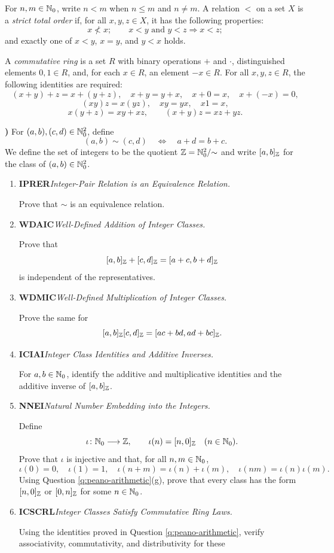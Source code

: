 \documentclass[10pt,a4paper]{article}
\newcounter{examquestion}
\newcommand{\examquestion}[1]{%
  \Needspace{5\baselineskip}%
  \refstepcounter{examquestion}%
  \par\addvspace{0.8\baselineskip}%
  \noindent\textbf{\theexamquestion)}\enspace #1\par
}
\newenvironment{subquestions}
  {\begin{enumerate}[label=\alph*),leftmargin=2.1em]}
  {\end{enumerate}}
\newcommand{\nameditem}[2]{%
  \textbf{\textsf{#1}}\enspace\emph{#2.}\enspace
}
\begin{document}
For $n,m\in\mathbb{N}_0$, write $n<m$ when $n\leq m$ and $n\ne m$.
A relation $<$ on a set $X$ is a \emph{strict total order} if, for all
$x,y,z\in X$, it has the following properties:
\[
  x\nless x;\qquad
  x<y\text{ and }y<z\Longrightarrow x<z;
\]
and exactly one of $x<y$, $x=y$, and $y<x$ holds.

A \emph{commutative ring} is a set $R$ with binary operations $+$ and
$\cdot$, distinguished elements $0,1\in R$, and, for each $x\in R$, an
element $-x\in R$.  For all $x,y,z\in R$, the following identities are
required:
\[
  (x+y)+z=x+(y+z),\quad x+y=y+x,\quad x+0=x,\quad x+(-x)=0,
\]
\[
  (xy)z=x(yz),\quad xy=yx,\quad x1=x,
\]
\[
  x(y+z)=xy+xz,\qquad (x+y)z=xz+yz.
\]

\examquestion{\label{q:integers}
For $(a,b),(c,d)\in\mathbb{N}_0^2$, define
\[
  (a,b)\sim(c,d)\quad\Longleftrightarrow\quad a+d=b+c.
\]
We define the set of integers to be the quotient
$\mathbb{Z}=\mathbb{N}_0^2/{\sim}$ and write $[a,b]_{\mathbb{Z}}$ for the class of
$(a,b)\in\mathbb{N}_0^2$.
\begin{subquestions}
  \item \nameditem{IPRER}{Integer-Pair Relation is an Equivalence Relation}
  Prove that $\sim$ is an equivalence relation.
  \item \nameditem{WDAIC}{Well-Defined Addition of Integer Classes}
  Prove that
  \[
    [a,b]_{\mathbb{Z}}+[c,d]_{\mathbb{Z}}=[a+c,b+d]_{\mathbb{Z}}
  \]
  is independent of the representatives.
  \item \nameditem{WDMIC}{Well-Defined Multiplication of Integer Classes}
  Prove the same for
  \[
    [a,b]_{\mathbb{Z}}[c,d]_{\mathbb{Z}}=[ac+bd,ad+bc]_{\mathbb{Z}}.
  \]
  \item \nameditem{ICIAI}{Integer Class Identities and Additive Inverses}
  For $a,b\in\mathbb{N}_0$, identify the additive and multiplicative
  identities and the additive inverse of $[a,b]_{\mathbb{Z}}$.
  \item \nameditem{NNEI}{Natural Number Embedding into the Integers}
  Define
  \[
    \iota\colon\mathbb{N}_0\longrightarrow\mathbb{Z},
    \qquad \iota(n)=[n,0]_{\mathbb{Z}}\quad(n\in\mathbb{N}_0).
  \]
  Prove that $\iota$ is injective and that, for all $n,m\in\mathbb{N}_0$,
  \[
    \iota(0)=0,\quad \iota(1)=1,\quad
    \iota(n+m)=\iota(n)+\iota(m),\quad
    \iota(nm)=\iota(n)\iota(m).
  \]
  Using Question \ref{q:peano-arithmetic}(g), prove that
  every class has the form $[n,0]_{\mathbb{Z}}$ or $[0,n]_{\mathbb{Z}}$ for some
  $n\in\mathbb{N}_0$.
  \item \nameditem{ICSCRL}{Integer Classes Satisfy Commutative Ring Laws}
  Using the identities proved in Question \ref{q:peano-arithmetic},
  verify associativity, commutativity, and distributivity for these

\end{subquestions}}
\end{document}
